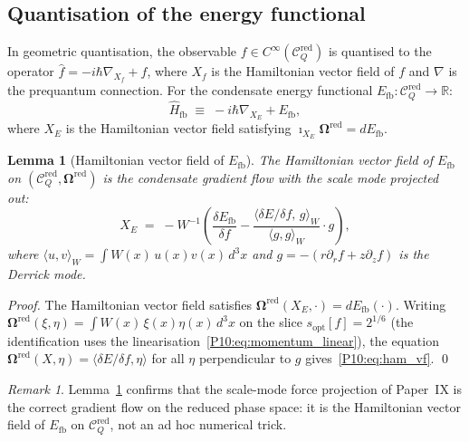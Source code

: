 \documentclass[11pt,a4paper]{article}
\newtheorem{lemma}[theorem]{Lemma}
\theoremstyle{definition}
\theoremstyle{remark}
\newtheorem{remark}[theorem]{Remark}
\newcommand{\Efb}{E_{\mathrm{fb}}}
\newcommand{\sopt}{s_{\mathrm{opt}}}
\newcommand{\RR}{\mathbb{R}}
\newcommand{\CQr}{\mathcal{C}_Q^{\mathrm{red}}}
\newcommand{\bOmega}{\boldsymbol{\Omega}}
\begin{document}
\subsection{Quantisation of the energy functional}

In geometric quantisation, the observable $f\in C^\infty(\CQr)$
is quantised to the operator
$\hat{f} = -i\hbar\nabla_{X_f} + f$,
where $X_f$ is the Hamiltonian vector field of $f$ and $\nabla$ is
the prequantum connection.
For the condensate energy functional $\Efb:\CQr\to\RR$:
\begin{equation}
  \hat{H}_\mathrm{fb}
  \;\equiv\; -i\hbar\nabla_{X_E} + \Efb,
  \label{P10:eq:Hfb}
\end{equation}
where $X_E$ is the Hamiltonian vector field satisfying
$\imath_{X_E}\bOmega^{\mathrm{red}} = d\Efb$.

\begin{lemma}[Hamiltonian vector field of $\Efb$]
\label{P10:lem:ham_vf}
The Hamiltonian vector field of $\Efb$ on $(\CQr,\bOmega^{\mathrm{red}})$
is the condensate gradient flow with the scale mode projected out:
\begin{equation}
  X_E \;=\; -W^{-1}\left(\frac{\delta\Efb}{\delta f}
  - \frac{\langle\delta E/\delta f,\,g\rangle_W}
         {\langle g,g\rangle_W}\cdot g\right),
  \label{P10:eq:ham_vf}
\end{equation}
where $\langle u,v\rangle_W = \int W(x)\,u(x)v(x)\,d^3x$
and $g = -(r\partial_r f + z\partial_z f)$ is the Derrick mode.
\end{lemma}

\begin{proof}
The Hamiltonian vector field satisfies $\bOmega^{\mathrm{red}}
(X_E,\cdot) = d\Efb(\cdot)$.
Writing $\bOmega^{\mathrm{red}}(\xi,\eta) =
\int W(x)\,\xi(x)\eta(x)\,d^3x$ on the slice $\sopt[f]=2^{1/6}$
(the identification uses the linearisation~\eqref{P10:eq:momentum_linear}),
the equation $\bOmega^{\mathrm{red}}(X,\eta) =
\langle\delta E/\delta f,\eta\rangle$ for all $\eta$ perpendicular
to $g$ gives~\eqref{P10:eq:ham_vf}.
\qed
\end{proof}

\begin{remark}
\label{P10:rem:ham_vf_confirms}
Lemma~\ref{P10:lem:ham_vf} confirms that the scale-mode force projection
of Paper~IX is the correct gradient flow on the reduced phase space:
it is the Hamiltonian vector field of $\Efb$ on $\CQr$,
not an ad hoc numerical trick.
\end{remark}
\end{document}
